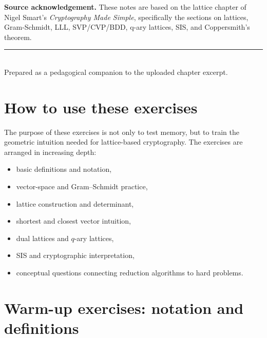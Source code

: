 \documentclass[11pt]{article}
\newenvironment{infobox}{%
  \def\FrameCommand{\fboxrule=0.8pt \fboxsep=8pt \colorbox{noteblue}}%
  \MakeFramed{\advance\hsize-\width \FrameRestore}}{\endMakeFramed}
\begin{document}
\begin{infobox}
\textbf{Source acknowledgement.} These notes are based on the lattice chapter of Nigel Smart's \emph{Cryptography Made Simple}, specifically the sections on lattices, Gram-Schmidt, LLL, SVP/CVP/BDD, q-ary lattices, SIS, and Coppersmith's theorem.
\end{infobox}

\vfill
\begin{center}
\rule{0.7\linewidth}{0.4pt}\\
{\small Prepared as a pedagogical companion to the uploaded chapter excerpt.}
\end{center}

\newpage

\section{How to use these exercises}

The purpose of these exercises is not only to test memory, but to train the geometric intuition needed for lattice-based cryptography. The exercises are arranged in increasing depth:

\begin{itemize}
	\item basic definitions and notation,
	\item vector-space and Gram--Schmidt practice,
	\item lattice construction and determinant,
	\item shortest and closest vector intuition,
	\item dual lattices and \(q\)-ary lattices,
	\item SIS and cryptographic interpretation,
	\item conceptual questions connecting reduction algorithms to hard problems.
\end{itemize}

\section{Warm-up exercises: notation and definitions}
\end{document}
